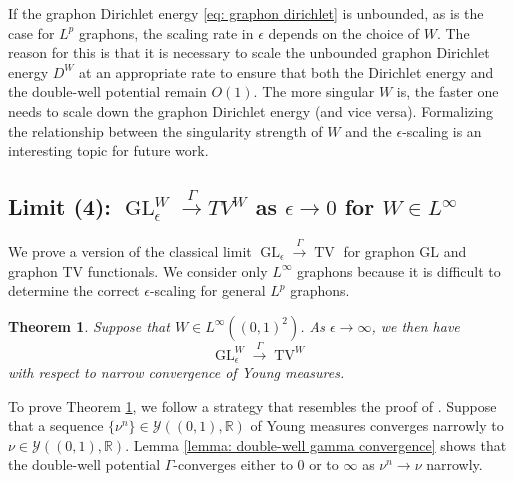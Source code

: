 \documentclass[11pt]{amsart}
\newtheorem{theorem}{Theorem}[section]
\def\R{\mathbb{R}}
\def\ep{\epsilon}
\def\ra{\rightarrow}
\def\gamra{\stackrel{\Gamma}{\longrightarrow}}
\def\GL{\operatorname{GL}}
\def\TV{\operatorname{TV}}
\numberwithin{equation}{section}
\begin{document}
{If the graphon Dirichlet energy \eqref{eq: graphon dirichlet} is unbounded, as is the case for $L^p$ graphons, the scaling {rate} in $\ep$ depends on the choice of $W$. The reason for this is that it is necessary to scale the unbounded graphon Dirichlet energy $D^W$ at an appropriate rate to ensure that both the Dirichlet energy and the double-well potential remain $O(1)$. The more singular $W$ is, the faster one needs to scale down the graphon Dirichlet energy (and vice versa). Formalizing the relationship between the singularity strength of $W$ and the $\ep$-scaling is an interesting topic for future work.




\subsection{\texorpdfstring{Limit (4): $\GL^W_\ep \gamra TV^W$ as $\ep \ra 0$ for {$W \in L^\infty$}}{Limit (4)}} \label{sec: limit (4)}

We prove a version of the classical limit $\GL_\ep \gamra \TV$ for graphon GL and graphon TV functionals. We consider only $L^\infty$ graphons because it is difficult to determine the correct $\ep$-scaling for general $L^p$ graphons. 



\begin{theorem}\label{thm: graphon gl convergence ep limit}
Suppose that $W \in L^\infty((0,1)^2)$. {As $\ep \ra \infty$, we then have}
    \begin{equation}
     	\GL^W_\ep \gamra \TV^W 
     \end{equation}
     {with respect to narrow convergence of Young measures.} 
\end{theorem}

To prove Theorem \ref{thm: graphon gl convergence ep limit}, we follow a strategy that resembles the proof of \cite[Theorem 3.1]{van2012gamma}. Suppose that {a sequence {$\{\nu^n\} \in \mathcal{Y}((0,1),\R)$} of Young measures} converges narrowly to $\nu \in \mathcal{Y}((0,1),\R)$. Lemma \ref{lemma: double-well gamma convergence} shows that the double-well potential $\Gamma$-converges either to $0$ or to $\infty$ as $\nu^n \ra \nu$ narrowly.

}
\end{document}
